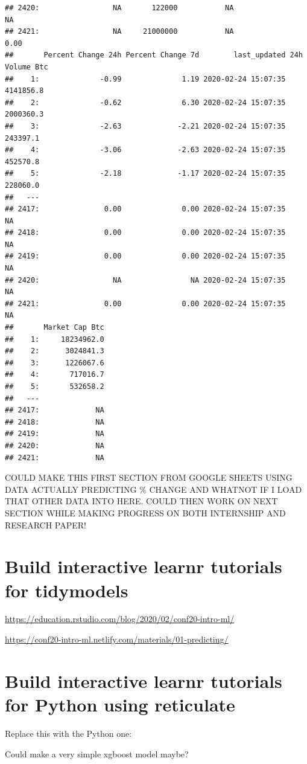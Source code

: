 \documentclass[
]{book}
\begin{document}
\begin{verbatim}
## 2420:                 NA       122000           NA                NA
## 2421:                 NA     21000000           NA              0.00
##       Percent Change 24h Percent Change 7d        last_updated 24h Volume Btc
##    1:              -0.99              1.19 2020-02-24 15:07:35      4141856.8
##    2:              -0.62              6.30 2020-02-24 15:07:35      2000360.3
##    3:              -2.63             -2.21 2020-02-24 15:07:35       243397.1
##    4:              -3.06             -2.63 2020-02-24 15:07:35       452570.8
##    5:              -2.18             -1.17 2020-02-24 15:07:35       228060.0
##   ---                                                                        
## 2417:               0.00              0.00 2020-02-24 15:07:35             NA
## 2418:               0.00              0.00 2020-02-24 15:07:35             NA
## 2419:               0.00              0.00 2020-02-24 15:07:35             NA
## 2420:                 NA                NA 2020-02-24 15:07:35             NA
## 2421:               0.00              0.00 2020-02-24 15:07:35             NA
##       Market Cap Btc
##    1:     18234962.0
##    2:      3024841.3
##    3:      1226067.6
##    4:       717016.7
##    5:       532658.2
##   ---               
## 2417:             NA
## 2418:             NA
## 2419:             NA
## 2420:             NA
## 2421:             NA
\end{verbatim}

COULD MAKE THIS FIRST SECTION FROM GOOGLE SHEETS USING DATA ACTUALLY PREDICTING \% CHANGE AND WHATNOT IF I LOAD THAT OTHER DATA INTO HERE. COULD THEN WORK ON NEXT SECTION WHILE MAKING PROGRESS ON BOTH INTERNSHIP AND RESEARCH PAPER!

\hypertarget{build-interactive-learnr-tutorials-for-tidymodels}{%
\section{Build interactive learnr tutorials for tidymodels}\label{build-interactive-learnr-tutorials-for-tidymodels}}

\url{https://education.rstudio.com/blog/2020/02/conf20-intro-ml/}

\url{https://conf20-intro-ml.netlify.com/materials/01-predicting/}

\hypertarget{build-interactive-learnr-tutorials-for-python-using-reticulate}{%
\section{Build interactive learnr tutorials for Python using reticulate}\label{build-interactive-learnr-tutorials-for-python-using-reticulate}}

Replace this with the Python one:

Could make a very simple xgboost model maybe?

  
\end{document}
